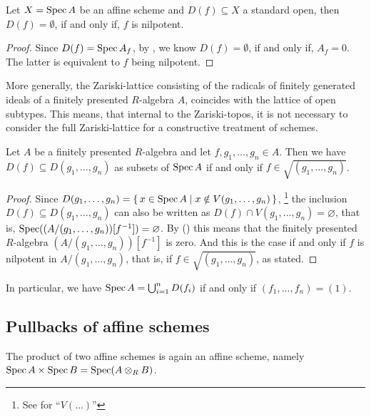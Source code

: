 \begin{lemma}%
  \label{standard-open-empty}
  Let $X=\operatorname{Spec} A$ be an affine scheme and $D(f)\subseteq X$ a standard open,
  then $D(f)=\emptyset$, if and only if, $f$ is nilpotent.
\end{lemma}

\begin{proof}
  Since $D(f)=\operatorname{Spec} A_f$, by , we know $D(f)=\emptyset$,
  if and only if, $A_f=0$.
  The latter is equivalent to $f$ being nilpotent.
\end{proof}

More generally,
the Zariski-lattice consisting of the radicals
of finitely generated ideals of a finitely presented $R$-algebra $A$,
coincides with the lattice of open subtypes.
This means, that internal to the Zariski-topos,
it is not necessary to consider the full Zariski-lattice for a constructive treatment of schemes.

\begin{lemma}%
  Let $A$ be a finitely presented $R$-algebra
  and let $f, g_1, \dots, g_n \in A$.
  Then we have $D(f) \subseteq D(g_1, \dots, g_n)$
  as subsets of $\operatorname{Spec} A$
  if and only if $f \in \sqrt{(g_1, \dots, g_n)}$.
\end{lemma}

\begin{proof}
  Since $D(g_1, \dots, g_n) = \{\, x \in \operatorname{Spec} A \mid x \notin V(g_1, \dots, g_n) \,\}$,
  \footnote{See  for ``$V(\dots)$''}
  the inclusion $D(f) \subseteq D(g_1, \dots, g_n)$
  can also be written as
  $D(f) \cap V(g_1, \dots, g_n) = \varnothing$, that is,
  $\operatorname{Spec}((A/(g_1, \dots, g_n))[f^{-1}]) = \varnothing$.
  By ()
  this means that the finitely presented $R$-algebra $(A/(g_1, \dots, g_n))[f^{-1}]$
  is zero.
  And this is the case if and only if $f$ is nilpotent in $A/(g_1, \dots, g_n)$,
  that is, if $f \in \sqrt{(g_1, \dots, g_n)}$, as stated.
\end{proof}

In particular,
we have $\operatorname{Spec} A = \bigcup_{i = 1}^n D(f_i)$
if and only if $(f_1, \dots, f_n) = (1)$.

\subsection{Pullbacks of affine schemes}

\begin{lemma}%
  \label{affine-product}
  The product of two affine schemes is again an affine scheme,
  namely
  $\operatorname{Spec} A \times \operatorname{Spec} B = \operatorname{Spec} (A \otimes_R B)$.
\end{lemma}

